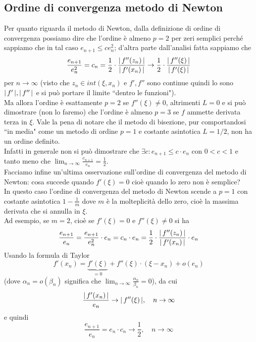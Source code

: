 \subsection{Ordine di convergenza metodo di Newton}
Per quanto riguarda il metodo di Newton, dalla definizione di ordine di convergenza possiamo dire che l'ordine è almeno $p=2$ per zeri semplici perché sappiamo che in tal caso $e_{n+1} \leq ce^2_n$; d'altra parte dall'analisi fatta sappiamo che
\[\frac{e_{n+1}}{e_n^2} = c_n = \frac{1}{2} \cdot \frac{\lvert\,f''(z_n)\,\rvert}{\lvert\,f'(x_n)\,\rvert} \to \frac{1}{2} \cdot \frac{\lvert\,f''(\xi)\,\rvert}{\lvert\,f'(\xi)\,\rvert}\]
per $n \to \infty$ (visto che $z_n \in int(\xi,x_n)$ e $f', f''$ sono continue quindi lo sono $\lvert\,f'\,\rvert, \lvert\,f''\,\rvert$ e si può portare il limite ``dentro le funzioni").\\
Ma allora l'ordine è esattamente $p=2$ se $f''(\xi) \neq 0$, altrimenti $L=0$ e si può dimostrare (non lo faremo) che l'ordine è almeno $p=3$ se $f$ ammette derivata terza in $\xi$.
\newline \newline
Vale la pena di notare che il metodo di bisezione, pur comportandosi ``in media" come un metodo di ordine $p=1$ e costante asintotica $L=1/2$, non ha un ordine definito.\\
Infatti in generale non si può dimostrare che $\exists c: e_{n+1} \leq c\cdot e_n$ con $0<c<1$ e tanto meno che $\lim_{n\to \infty} \frac{e_{n+1}}{e_n} = \frac{1}{2}$.\\
Facciamo infine un'ultima osservazione sull'ordine di convergenza del metodo di Newton: cosa succede quando  $f'(\xi) = 0$ cioè quando lo zero non è semplice?\\
In questo caso l'ordine di convergenza del metodo di Newton scende a $p=1$ con costante asintotica $1-\frac{1}{m}$ dove $m$ è la molteplicità dello zero, cioè la massima derivata che si annulla in $\xi$.\\
Ad esempio, se $m=2$, cioè se $f'(\xi) = 0$ e $f''(\xi) \neq 0$ si ha
\[\frac{e_{n+1}}{e_n} = \frac{e_{n+1}}{e_n^2} \cdot e_n = c_n \cdot e_n = \frac{1}{2} \cdot \frac{\lvert\,f''(z_n)\,\rvert}{\lvert\,f'(x_n)\,\rvert} \cdot e_n\]
Usando la formula di Taylor
\[ f'(x_n)=\underbrace{f'(\xi)}_{=0} + f''(\xi)\cdot (\xi - x_n)+o(e_n) \]
(dove $\alpha_n = o(\beta_n)$ significa che $\lim_{n \to \infty} \frac{\alpha_n}{\beta_n} = 0$), da cui
\[\frac{\lvert\,f'(x_n)\,\rvert}{e_n} \to \lvert\,f''(\xi)\,\rvert, \quad n \to \infty\]
e quindi
\[ \frac{e_{n+1}}{e_n} = e_n \cdot c_n \to \frac{1}{2}, \quad n \to \infty \]

